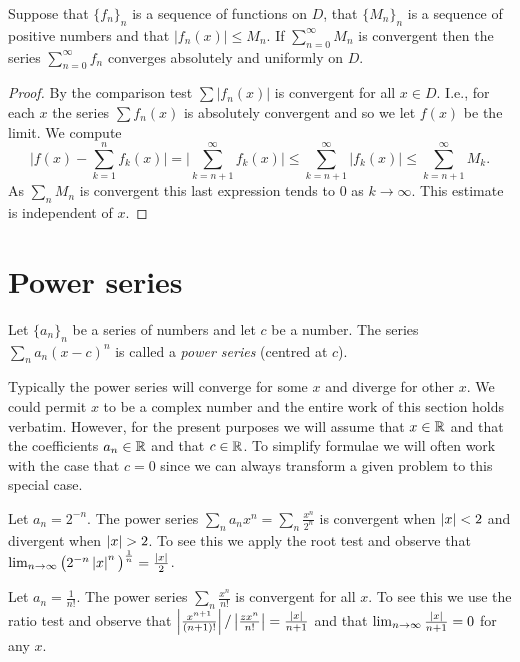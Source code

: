 \begin{theorem}
  Suppose that \({\{f_n\}}_n\) is a sequence of functions on \(D\), that \({\{M_n\}}_n\) is a sequence of positive numbers
  and that \(|f_n(x)|\leq M_n\).
  If \(\sum_{n=0}^{\infty}M_n\) is convergent then the series \(\sum_{n=0}^{\infty}f_n\) converges absolutely and uniformly on \(D\).
\end{theorem}

\begin{proof}
  By the comparison test \(\sum |f_n(x)| \) is convergent for all \(x\in D\).
  I.e., for each \(x\) the series \(\sum f_n(x) \) is absolutely convergent and so we let \(f(x)\) be the limit.
  We compute
  \[
    \Big|f(x) - \sum_{k=1}^{n} f_k(x)  \Big|
    =
    \Big|\sum_{k=n+1}^{\infty} f_k(x)  \Big|
    \leq \sum_{k=n+1}^{\infty} |f_k(x)|
    \leq  \sum_{k=n+1}^{\infty} M_k.
  \]
  As \(\sum_{n}M_n\) is convergent this last expression tends to \(0\) as \(k\to \infty\).
  This estimate is independent of \(x\).
\end{proof}

\section{Power series}

\begin{definition}
  Let \({\{a_n\}}_{n}\) be a series of numbers and let \(c\) be a number.
  The series
  \(\sum_{n} a_n {(x-c)}^n\)
  is called a \emph{power series} (centred at \(c\)).
\end{definition}
Typically the power series will converge for some \(x\) and diverge for other \(x\).
We could permit \(x\) to be a complex number and the entire work of this section holds verbatim.
However, for the present purposes we will assume that \(x \in \mathbb{R}\) and that the coefficients \(a_n \in \mathbb{R}\) and that \(c\in \mathbb{R}\).
To simplify formulae we will often work with the case that \(c=0\) since we can always transform a given problem to this special case.

\begin{example*}
  Let \(a_n = 2^{-n}\).
  The power series \(\sum_{n} a_n x^n = \sum_{n}\frac{x^n}{2^n}\) is convergent when \(\left|x\right|<2\) and divergent  when \(\left|x\right| > 2\).
  To see this we apply the root test and observe that  \(\lim_{n\to\infty}{\big(2^{-n}\left|x\right|^n \big)}^{\frac{1}{n}}=\frac{\left|x\right|}{2}\).
\end{example*}

\begin{example*}
  Let \(a_n = \frac{1}{n!}\).
  The power series \(\sum_{n}\frac{x^n}{n!}\) is convergent for all \(x\).
  To see this we use the ratio test and observe that  \(\left|\frac{x^{n+1}}{(n+1)!} \right|/ \left|\frac{zx^n}{n!}\right| = \frac{\left|x\right|}{n+1}\) and that \(\lim_{n\to\infty} \frac{\left|x\right|}{n+1} = 0 \) for any \(x\).
\end{example*}


